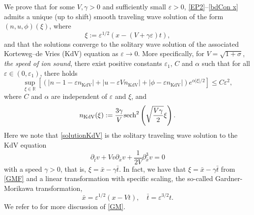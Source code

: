 \documentclass{amsart}
\newcommand{\veps}{\varepsilon}
\numberwithin{equation}{section}
\theoremstyle{plain}%
\theoremstyle{definition}
\theoremstyle{remark}
\theoremstyle{remark}
\begin{document}
We prove that for some $V,\gamma>0$ and sufficiently small $\veps>0$, \eqref{EP2}--\eqref{bdCon x} admits a unique (up to shift)  smooth traveling wave solution of the form $(n,u,\phi)(\xi)$, where
\begin{equation}\label{GMF}
\xi :=\veps^{1/2}\left( x-(V+\gamma\veps) t \right),
\end{equation}
and that the solutions converge to the solitary wave solution of the associated Korteweg–de Vries (KdV) equation  as $\veps \to 0$.
More specifically, for $V=\sqrt{1+\sigma}$,  \textit{the speed of ion sound},
 there exist positive constants $\veps_1$, $C$ and $\alpha$ such that for all $\veps\in(0,\veps_1)$, there holds 
\begin{equation}\label{Main Result}
\sup_{\xi\in\mathbb{R}}\left[ \left( |n-1-\veps n_{\text{KdV}}| + |u-\veps V n_{\text{KdV}}| + |\phi - \veps n_{\text{KdV}}| \right) e^{\alpha|\xi|/2} \right] \leq  C \veps^2,
\end{equation}
where $C$ and $\alpha$ are independent of $\veps$ and $\xi$, and
\begin{equation}\label{solutionKdV} 
n_{\text{KdV}}(\xi) := \frac{3\gamma}{V}\textnormal{sech}^2\left(\sqrt{\frac{V\gamma}{2}}\xi \right).
\end{equation}
Here we note that \eqref{solutionKdV} is the solitary traveling wave solution to the KdV equation
\begin{equation}\tag{KdV}\label{KdV}
\partial_{\bar{t}} v + V v\partial_{\bar{x}} v + \frac{1}{2V}\partial_{\bar{x}}^3 v = 0
\end{equation}
with a speed $\gamma>0$, that is,  $\xi = \bar{x}- \gamma \bar{t}$. In fact, we have that $\xi = \bar{x}- \gamma \bar{t}$ from \eqref{GMF}
and a linear transformation with specific scaling, the so-called Gardner-Morikawa transformation, 
\begin{equation}\tag{GM}\label{GM}
\bar{x} = \veps^{1/2}(x-Vt), \quad \bar{t} = \veps^{3/2}t.
\end{equation}
We refer to \cite{Gar} for more discussion of \eqref{GM}.
\end{document}
